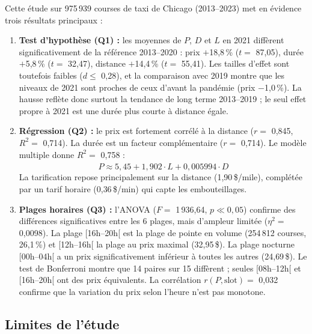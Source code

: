 \documentclass[11pt,a4paper]{article}
\begin{document}
Cette étude sur 975\,939 courses de taxi de Chicago (2013--2023) met en évidence trois résultats principaux :
\begin{enumerate}
  \item \textbf{Test d'hypothèse (Q1) :} les moyennes de $P$, $D$ et $L$ en 2021 diffèrent significativement de
        la référence 2013--2020 : prix $+$18{,}8\,\% ($t = $ 87{,}05), durée $+$5{,}8\,\% ($t = $ 32{,}47),
        distance $+$14{,}4\,\% ($t = $ 55{,}41). Les tailles d'effet sont toutefois faibles ($d \le$ 0{,}28),
        et la comparaison avec 2019 montre que les niveaux de 2021 sont proches de ceux d'avant la pandémie
        (prix $-$1{,}0\,\%). La hausse reflète donc surtout la tendance de long terme 2013--2019 ; le seul effet
        propre à 2021 est une durée plus courte à distance égale.
  \item \textbf{Régression (Q2) :} le prix est fortement corrélé à la distance ($r = $ 0{,}845, $R^2 = $ 0{,}714).
        La durée est un facteur complémentaire ($r = $ 0{,}714). Le modèle multiple donne $R^2 = $ 0{,}758 :
        \[ \hat P \approx 5{,}45 + 1{,}902 \cdot L + 0{,}005994 \cdot D \]
        La tarification repose principalement sur la distance (1{,}90\,\$/mile), complétée par un tarif horaire
        (0{,}36\,\$/min) qui capte les embouteillages.
  \item \textbf{Plages horaires (Q3) :} l'ANOVA ($F = $ 1\,936{,}64, $p \ll 0{,}05$) confirme des différences
        significatives entre les 6 plages, mais d'ampleur limitée ($\eta^2 = $ 0{,}0098). La plage
        {[}16h--20h{[} est la plage de pointe en volume (254\,812 courses, 26{,}1\,\%) et {[}12h--16h{[} la plage au
        prix maximal (32{,}95\,\$). La plage nocturne [00h--04h[ a un prix significativement inférieur à toutes
        les autres (24{,}69\,\$). Le test de Bonferroni montre que 14 paires sur 15 diffèrent ; seules
        [08h--12h[ et [16h--20h[ ont des prix équivalents. La corrélation $r(P, \text{slot}) = $ 0{,}032 confirme
        que la variation du prix selon l'heure n'est pas monotone.
\end{enumerate}

\subsection{Limites de l'étude}
\end{document}
